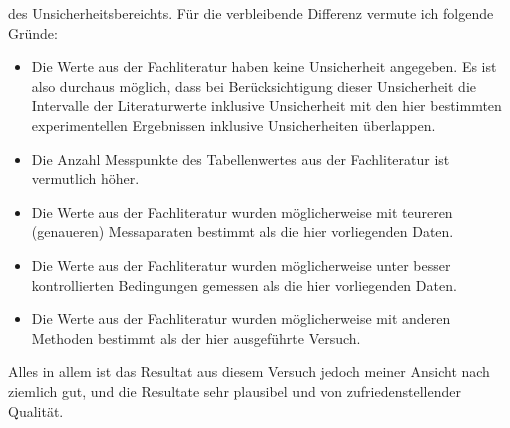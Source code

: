 \begin{itemize}
        des Unsicherheitsbereichts.
        F\"ur die verbleibende Differenz vermute ich folgende Gr\"unde:
        \begin{itemize}
            \item
                Die  Werte  aus  der Fachliteratur  haben  keine  Unsicherheit
                angegeben. Es   ist   also   durchaus  m\"oglich,   dass   bei
                Ber\"ucksichtigung   dieser    Unsicherheit   die   Intervalle
                der    Literaturwerte   inklusive    Unsicherheit   mit    den
                hier   bestimmten    experimentellen   Ergebnissen   inklusive
                Unsicherheiten \"uberlappen.
            \item
                Die Anzahl Messpunkte des Tabellenwertes aus der Fachliteratur
                ist vermutlich h\"oher.
            \item
                Die Werte  aus der  Fachliteratur wurden  m\"oglicherweise mit
                teureren  (genaueren)  Messaparaten  bestimmt   als  die  hier
                vorliegenden Daten.
            \item
                Die Werte aus der  Fachliteratur wurden m\"oglicherweise unter
                besser  kontrollierten  Bedingungen   gemessen  als  die  hier
                vorliegenden Daten.
            \item
                Die Werte aus der  Fachliteratur wurden m\"oglicherweise mit
                anderen Methoden bestimmt als der hier ausgef\"uhrte Versuch.
        \end{itemize}
        Alles  in allem  ist das  Resultat  aus diesem  Versuch jedoch  meiner
        Ansicht nach  ziemlich gut, und  die Resultate sehr plausibel  und von
        zufriedenstellender Qualit\"at.
\end{itemize}

\begin{center}
%

\end{center}

